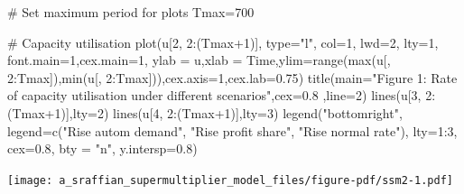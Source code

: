 \documentclass[
  letterpaper,
  DIV=11,
  numbers=noendperiod]{scrreprt}
\newenvironment{Shaded}{\begin{snugshade}}{\end{snugshade}}
\newcommand{\AttributeTok}[1]{\textcolor[rgb]{0.40,0.45,0.13}{#1}}
\newcommand{\CommentTok}[1]{\textcolor[rgb]{0.37,0.37,0.37}{#1}}
\newcommand{\DecValTok}[1]{\textcolor[rgb]{0.68,0.00,0.00}{#1}}
\newcommand{\FloatTok}[1]{\textcolor[rgb]{0.68,0.00,0.00}{#1}}
\newcommand{\FunctionTok}[1]{\textcolor[rgb]{0.28,0.35,0.67}{#1}}
\newcommand{\NormalTok}[1]{\textcolor[rgb]{0.00,0.23,0.31}{#1}}
\newcommand{\OtherTok}[1]{\textcolor[rgb]{0.00,0.23,0.31}{#1}}
\newcommand{\SpecialCharTok}[1]{\textcolor[rgb]{0.37,0.37,0.37}{#1}}
\newcommand{\StringTok}[1]{\textcolor[rgb]{0.13,0.47,0.30}{#1}}
\begin{document}
\begin{Shaded}
\begin{Highlighting}[]
\CommentTok{\# Set maximum period for plots}
\NormalTok{Tmax}\OtherTok{=}\DecValTok{700}

\CommentTok{\# Capacity utilisation}
\FunctionTok{plot}\NormalTok{(u[}\DecValTok{2}\NormalTok{, }\DecValTok{2}\SpecialCharTok{:}\NormalTok{(Tmax}\SpecialCharTok{+}\DecValTok{1}\NormalTok{)], }\AttributeTok{type=}\StringTok{"l"}\NormalTok{, }\AttributeTok{col=}\DecValTok{1}\NormalTok{, }\AttributeTok{lwd=}\DecValTok{2}\NormalTok{, }\AttributeTok{lty=}\DecValTok{1}\NormalTok{, }\AttributeTok{font.main=}\DecValTok{1}\NormalTok{,}\AttributeTok{cex.main=}\DecValTok{1}\NormalTok{, }
     \AttributeTok{ylab =} \StringTok{\textquotesingle{}u\textquotesingle{}}\NormalTok{,}\AttributeTok{xlab =} \StringTok{\textquotesingle{}Time\textquotesingle{}}\NormalTok{,}\AttributeTok{ylim=}\FunctionTok{range}\NormalTok{(}\FunctionTok{max}\NormalTok{(u[, }\DecValTok{2}\SpecialCharTok{:}\NormalTok{Tmax]),}\FunctionTok{min}\NormalTok{(u[, }\DecValTok{2}\SpecialCharTok{:}\NormalTok{Tmax])),}\AttributeTok{cex.axis=}\DecValTok{1}\NormalTok{,}\AttributeTok{cex.lab=}\FloatTok{0.75}\NormalTok{)}
\FunctionTok{title}\NormalTok{(}\AttributeTok{main=}\StringTok{"Figure 1: Rate of capacity utilisation under different scenarios"}\NormalTok{,}\AttributeTok{cex=}\FloatTok{0.8}\NormalTok{ ,}\AttributeTok{line=}\DecValTok{2}\NormalTok{)}
\FunctionTok{lines}\NormalTok{(u[}\DecValTok{3}\NormalTok{, }\DecValTok{2}\SpecialCharTok{:}\NormalTok{(Tmax}\SpecialCharTok{+}\DecValTok{1}\NormalTok{)],}\AttributeTok{lty=}\DecValTok{2}\NormalTok{)}
\FunctionTok{lines}\NormalTok{(u[}\DecValTok{4}\NormalTok{, }\DecValTok{2}\SpecialCharTok{:}\NormalTok{(Tmax}\SpecialCharTok{+}\DecValTok{1}\NormalTok{)],}\AttributeTok{lty=}\DecValTok{3}\NormalTok{)}
\FunctionTok{legend}\NormalTok{(}\StringTok{"bottomright"}\NormalTok{, }\AttributeTok{legend=}\FunctionTok{c}\NormalTok{(}\StringTok{"Rise autom demand"}\NormalTok{, }\StringTok{"Rise profit share"}\NormalTok{, }\StringTok{"Rise normal rate"}\NormalTok{),}
       \AttributeTok{lty=}\DecValTok{1}\SpecialCharTok{:}\DecValTok{3}\NormalTok{, }\AttributeTok{cex=}\FloatTok{0.8}\NormalTok{, }\AttributeTok{bty =} \StringTok{"n"}\NormalTok{, }\AttributeTok{y.intersp=}\FloatTok{0.8}\NormalTok{)}
\end{Highlighting}
\end{Shaded}

\texttt{[image: a\_sraffian\_supermultiplier\_model\_files/figure-pdf/ssm2-1.pdf]}
\end{document}
